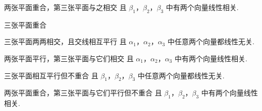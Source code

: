 \begin{fcard}{两张平面重合，第三张平面与之相交}
且 $\beta_1$，$\beta_2$，$\beta_3$ 中有两个向量线性相关.
\end{fcard}

\begin{fcard}{三张平面重合}
\end{fcard}



\begin{fcard}{三张平面两两相交，且交线相互平行}
且 $\alpha_1$，$\alpha_2$，$\alpha_3$ 中任意两个向量都线性无关.
\end{fcard}

\begin{fcard}{两张平面平行，第三张平面与它们相交}
且 $\alpha_1$，$\alpha_2$，$\alpha_3$ 中有两个向量线性相关.
\end{fcard}


\begin{fcard}{三张平面相互平行但不重合}
且 $\beta_1$，$\beta_2$，$\beta_3$ 中任意两个向量都线性无关.
\end{fcard}

\begin{fcard}{两张平面重合，第三张平面与它们平行但不重合}
且 $\beta_1$，$\beta_2$，$\beta_3$ 中有两个向量线性相关.
\end{fcard}

